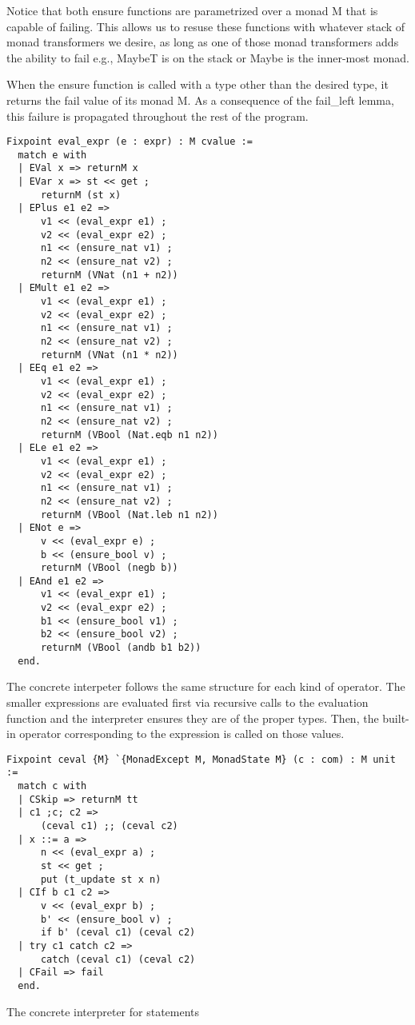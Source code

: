 Notice that both ensure functions are parametrized over a monad M that is
capable of failing. This allows us to resuse these functions with whatever
stack of monad transformers we desire, as long as one of those monad
transformers adds the ability to fail e.g., MaybeT is on the stack or Maybe is
the inner-most monad.

When the ensure function is called with a type other than the desired type, it
returns the fail value of its monad M. As a consequence of the
fail\_left lemma, this failure is propagated throughout the rest of the
program.

\begin{listing}[H]
\begin{verbatim}
Fixpoint eval_expr (e : expr) : M cvalue :=
  match e with
  | EVal x => returnM x
  | EVar x => st << get ;
      returnM (st x)
  | EPlus e1 e2 => 
      v1 << (eval_expr e1) ;
      v2 << (eval_expr e2) ;
      n1 << (ensure_nat v1) ;
      n2 << (ensure_nat v2) ;
      returnM (VNat (n1 + n2))
  | EMult e1 e2 =>
      v1 << (eval_expr e1) ;
      v2 << (eval_expr e2) ;
      n1 << (ensure_nat v1) ;
      n2 << (ensure_nat v2) ;
      returnM (VNat (n1 * n2))
  | EEq e1 e2 =>
      v1 << (eval_expr e1) ;
      v2 << (eval_expr e2) ;
      n1 << (ensure_nat v1) ;
      n2 << (ensure_nat v2) ;
      returnM (VBool (Nat.eqb n1 n2))
  | ELe e1 e2 =>
      v1 << (eval_expr e1) ;
      v2 << (eval_expr e2) ;
      n1 << (ensure_nat v1) ;
      n2 << (ensure_nat v2) ;
      returnM (VBool (Nat.leb n1 n2))
  | ENot e =>
      v << (eval_expr e) ;
      b << (ensure_bool v) ;
      returnM (VBool (negb b))
  | EAnd e1 e2 =>
      v1 << (eval_expr e1) ;
      v2 << (eval_expr e2) ;
      b1 << (ensure_bool v1) ;
      b2 << (ensure_bool v2) ;
      returnM (VBool (andb b1 b2))
  end.
\end{verbatim}
\end{listing}

The concrete interpeter follows the same structure for each kind of operator.
The smaller expressions are evaluated first via recursive calls to the
evaluation function and the interpreter
ensures they are of the proper types. Then, the built-in operator corresponding
to the expression is called on those values.

\begin{listing}[H]
\begin{verbatim}
Fixpoint ceval {M} `{MonadExcept M, MonadState M} (c : com) : M unit :=
  match c with
  | CSkip => returnM tt
  | c1 ;c; c2 => 
      (ceval c1) ;; (ceval c2)
  | x ::= a => 
      n << (eval_expr a) ;
      st << get ;
      put (t_update st x n)
  | CIf b c1 c2 => 
      v << (eval_expr b) ;
      b' << (ensure_bool v) ;
      if b' (ceval c1) (ceval c2)
  | try c1 catch c2 =>
   	  catch (ceval c1) (ceval c2)
  | CFail => fail
  end.
\end{verbatim}
\caption{The concrete interpreter for statements}
\label{lst:concrete_statements}
\end{listing}

